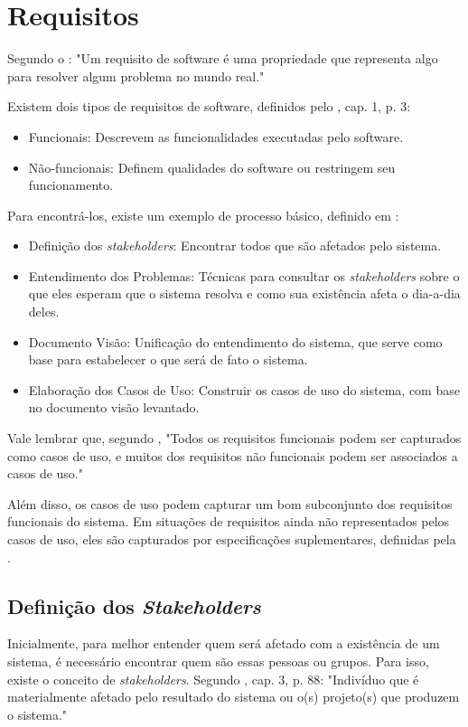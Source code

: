 \section{Requisitos}
Segundo o \citeauthor{ieeecomputersociety2014}: "Um requisito de software é uma propriedade que representa algo para resolver algum problema no mundo real."

Existem dois tipos de requisitos de software, definidos pelo \citeauthor{ieeecomputersociety2014}, cap. 1, p. 3:

\begin{itemize}
    \item Funcionais: Descrevem as funcionalidades executadas pelo software.
    \item Não-funcionais: Definem qualidades do software ou restringem seu funcionamento.
\end{itemize}

Para encontrá-los, existe um exemplo de processo básico, definido em \citeauthor{kurtbittnerianspence2002}:

\begin{itemize}
    \item Definição dos \textit{stakeholders}: Encontrar todos que são afetados pelo sistema.
    \item Entendimento dos Problemas: Técnicas para consultar os \textit{stakeholders} sobre o que eles esperam que o sistema resolva e como sua existência afeta o dia-a-dia deles.
    \item Documento Visão: Unificação do entendimento do sistema, que serve como base para estabelecer o que será de fato o sistema.
    \item Elaboração dos Casos de Uso: Construir os casos de uso do sistema, com base no documento visão levantado.
\end{itemize}

Vale lembrar que, segundo \citeauthor{kurtbittnerianspence2002}, "Todos os requisitos funcionais podem ser capturados como casos de uso, e muitos dos requisitos não funcionais podem ser associados a casos de uso."

Além disso, os casos de uso podem capturar um bom subconjunto dos requisitos funcionais do sistema. Em situações de requisitos ainda não representados pelos casos de uso, eles são capturados por especificações suplementares, definidas pela \citeauthor{ibm2011}\cite[cap. ~1, p. ~23]{kurtbittnerianspence2002}.

\subsection{Definição dos \textit{Stakeholders}}
Inicialmente, para melhor entender quem será afetado com a existência de um sistema, é necessário encontrar quem são essas pessoas ou grupos. Para isso, existe o conceito de \textit{stakeholders}. Segundo \citeauthor{kurtbittnerianspence2002}, cap. 3, p. 88: "Indivíduo que é materialmente afetado pelo resultado do sistema ou o(s) projeto(s) que produzem o sistema."

